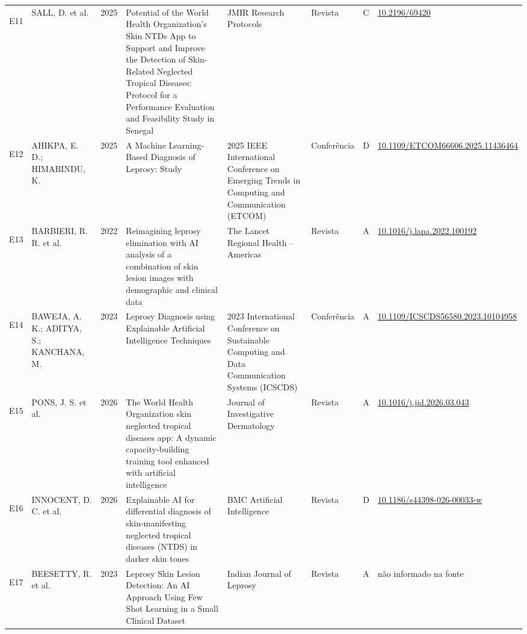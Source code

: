 \begin{longtable}{@{}lp{2.7cm}lp{3.6cm}p{2.7cm}llp{2.1cm}@{}}
\hypertarget{estudo:E11}{}E11 & SALL, D. et al. & 2025 & Potential of the World Health Organization's Skin NTDs App to Support and Improve the Detection of Skin-Related Neglected Tropical Diseases: Protocol for a Performance Evaluation and Feasibility Study in Senegal & JMIR Research Protocols & Revista & C & \href{https://doi.org/10.2196/69420}{10.\allowbreak{}2196/\allowbreak{}69420} \\
\hypertarget{estudo:E12}{}E12 & AHIKPA, E. D.; HIMABINDU, K. & 2025 & A Machine Learning-Based Diagnosis of Leprosy: Study & 2025 IEEE International Conference on Emerging Trends in Computing and Communication (ETCOM) & Conferência & D & \href{https://doi.org/10.1109/ETCOM66606.2025.11436464}{10.\allowbreak{}1109/\allowbreak{}ETCOM66606.\allowbreak{}2025.\allowbreak{}11436464} \\
\hypertarget{estudo:E13}{}E13 & BARBIERI, R. R. et al. & 2022 & Reimagining leprosy elimination with AI analysis of a combination of skin lesion images with demographic and clinical data & The Lancet Regional Health -- Americas & Revista & A & \href{https://doi.org/10.1016/j.lana.2022.100192}{10.\allowbreak{}1016/\allowbreak{}j.\allowbreak{}lana.\allowbreak{}2022.\allowbreak{}100192} \\
\hypertarget{estudo:E14}{}E14 & BAWEJA, A. K.; ADITYA, S.; KANCHANA, M. & 2023 & Leprosy Diagnosis using Explainable Artificial Intelligence Techniques & 2023 International Conference on Sustainable Computing and Data Communication Systems (ICSCDS) & Conferência & A & \href{https://doi.org/10.1109/ICSCDS56580.2023.10104958}{10.\allowbreak{}1109/\allowbreak{}ICSCDS56580.\allowbreak{}2023.\allowbreak{}10104958} \\
\hypertarget{estudo:E15}{}E15 & PONS, J. S. et al. & 2026 & The World Health Organization skin neglected tropical diseases app: A dynamic capacity-building training tool enhanced with artificial intelligence & Journal of Investigative Dermatology & Revista & A & \href{https://doi.org/10.1016/j.jid.2026.03.043}{10.\allowbreak{}1016/\allowbreak{}j.\allowbreak{}jid.\allowbreak{}2026.\allowbreak{}03.\allowbreak{}043} \\
\hypertarget{estudo:E16}{}E16 & INNOCENT, D. C. et al. & 2026 & Explainable AI for differential diagnosis of skin-manifesting neglected tropical diseases (NTDS) in darker skin tones & BMC Artificial Intelligence & Revista & D & \href{https://doi.org/10.1186/s44398-026-00033-w}{10.\allowbreak{}1186/\allowbreak{}s44398-026-00033-w} \\
\hypertarget{estudo:E17}{}E17 & BEESETTY, R. et al. & 2023 & Leprosy Skin Lesion Detection: An AI Approach Using Few Shot Learning in a Small Clinical Dataset & Indian Journal of Leprosy & Revista & A & não informado na fonte \\

\end{longtable}
